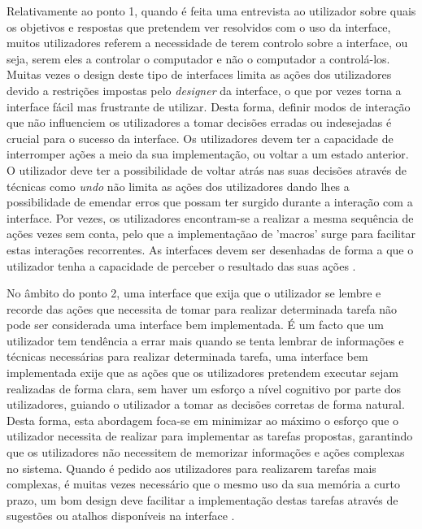 Relativamente ao ponto 1, quando é feita uma entrevista ao utilizador sobre quais os objetivos e respostas que pretendem ver resolvidos com o uso da interface, muitos utilizadores referem a necessidade de terem controlo sobre a interface, ou seja, serem eles a controlar o computador e não o computador a controlá-los. Muitas vezes o design deste tipo de interfaces limita as ações dos utilizadores devido a restrições impostas pelo \textit{designer} da interface, o que por vezes torna a interface fácil mas frustrante de utilizar. Desta forma, definir modos de interação que não influenciem os utilizadores a tomar decisões erradas ou indesejadas é crucial para o sucesso da interface. Os utilizadores devem ter a capacidade de interromper ações a meio da sua implementação, ou voltar a um estado anterior. O utilizador deve ter a possibilidade de voltar atrás nas suas decisões através de técnicas como \textit{undo} não limita as ações dos utilizadores dando lhes a possibilidade de emendar erros que possam ter surgido durante a interação com a interface. Por vezes, os utilizadores encontram-se a realizar a mesma sequência de ações vezes sem conta, pelo que a implementaçãao de 'macros' surge para facilitar estas interações recorrentes. As interfaces devem ser desenhadas de forma a que o utilizador tenha a capacidade de perceber o resultado das suas ações \cite{sridevi2014user}.

No âmbito do ponto 2, uma interface que exija que o utilizador se lembre e recorde das ações que necessita de tomar para realizar determinada tarefa não pode ser considerada uma interface bem implementada. É um facto que um utilizador tem tendência a errar mais quando se tenta lembrar de informações e técnicas necessárias para realizar determinada tarefa, uma interface bem implementada exije que as ações que os utilizadores pretendem executar sejam realizadas de forma clara, sem haver um esforço a nível cognitivo por parte dos utilizadores, guiando o utilizador a tomar as decisões corretas de forma natural. Desta forma, esta abordagem foca-se em minimizar ao máximo o esforço que o utilizador necessita de realizar para implementar as tarefas propostas, garantindo que os utilizadores não necessitem de memorizar informações e ações complexas no sistema. Quando é pedido aos utilizadores para realizarem tarefas mais complexas, é muitas vezes necessário que o mesmo uso da sua memória a curto prazo, um bom design deve facilitar a implementação destas tarefas através de sugestões ou atalhos disponíveis na interface \cite{sridevi2014user}.

